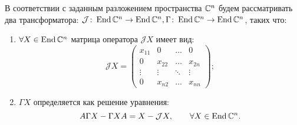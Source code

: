 В соответствии с заданным разложением пространства $\mathbb{C}^n$ будем рассматривать два трансформатора: $\mathcal{J}\colon \operatorname{End}\mathbb{C}^n \to \operatorname{End}\mathbb{C}^n, \Gamma\colon \operatorname{End}\mathbb{C}^n \to \operatorname{End}\mathbb{C}^n$, таких что:
\begin{enumerate}
	\item $\forall X \in \operatorname{End}\mathbb{C}^n$ матрица оператора $\mathcal{J}X$ имеет вид:
	$$
		\mathcal{J}X = \begin{pmatrix}
			x_{11} & 0      & \dots  & 0      \\
			0      & x_{22} & \dots  & x_{2n} \\
			\vdots & \vdots & \ddots & \vdots \\
			0      & x_{n2} & \dots  & x_{nn}
		\end{pmatrix};
	$$
	\item $\Gamma X$ определяется как решение уравнения:
	\begin{equation}\label{eq:gamma_x_rule}
		A\Gamma X - \Gamma X A = X - \mathcal{J}X,\qquad \forall X \in \operatorname{End}\mathbb{C}^n.
	\end{equation}
\end{enumerate}

